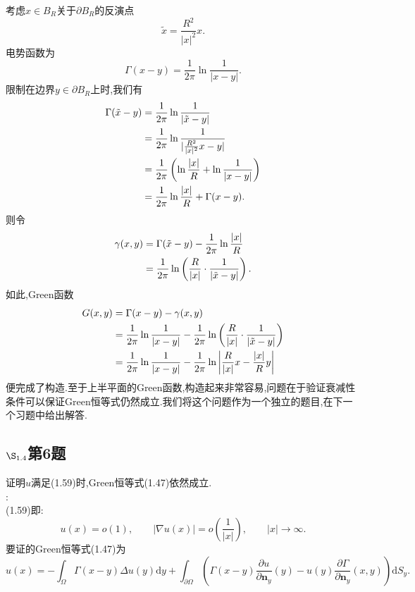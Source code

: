 \documentclass[12pt, a4paper]{ctexbook}
\newcommand{\dy}{\text{d}y}
\newcommand{\dS}{\text{d}S}
\begin{document}
    考虑$x\in B_R$关于$\partial B_R$的反演点$$\tilde{x}=\frac{R^2 }{|x|^2}x.$$
    电势函数为$$
    \Gamma (x-y)=\frac{1}{2\pi}    \ln\frac{1}{|x-y|}.$$
    限制在边界$y\in \partial B_R$上时,我们有
    \begin{align}
    \Gamma(\tilde{x}-y)&=\frac{1}{2\pi}    \ln\frac{1}{|\tilde{x}-y|} \notag\\
    &=\frac{1}{2\pi} \ln\frac{1}{|\frac{R^2 }{|x|^2}x-y|} \notag \\
    &=\frac{1}{2\pi} \left( \ln\frac{|x|}{R}+\ln \frac{1}{|x-y|} \right) \notag \\
    &=\frac{1}{2\pi} \ln\frac{|x|}{R}+ \Gamma (x-y) \notag .
    \end{align}
    则令
    \begin{align}
    \gamma(x,y) &= \Gamma(\tilde{x}-y)-\frac{1}{2\pi} \ln\frac{|x|}{R} \notag\\
    &= \frac{1}{2\pi} \ln\left( \frac{R}{|x|} \cdot\frac{1}{|\tilde{x}-y|} \right)\notag.
    \end{align}
    如此,Green函数
    \begin{align}
    G(x,y)&=\Gamma(x-y) -\gamma(x,y)\notag\\
    &=\frac{1}{2\pi} \ln\frac{1}{|x-y|}-\frac{1}{2\pi} \ln\left( \frac{R}{|x|} \cdot\frac{1}{|\tilde{x}-y|}\right) \notag\\
    &= \frac{1}{2\pi} \ln\frac{1}{|x-y|}- \frac{1}{2\pi} \ln \left| \frac{R}{|x|}x-\frac{|x|}{R}y\right| \notag
    \end{align}
    便完成了构造.至于上半平面的Green函数,构造起来非常容易,问题在于验证衰减性条件可以保证Green恒等式仍然成立.我们将这个问题作为一个独立的题目,在下一个习题中给出解答.
    
    \subsection{$\S_{1.4}$第6题}
    \kaishu{}证明$u$满足(1.59)时,Green恒等式(1.47)依然成立.\\
    
    \songti{}:\\
    
    (1.59)即:$$
    u(x)=o(1),\qquad |\nabla u(x)|=o\left( \frac{1}{|x|} \right), \qquad |x| \to \infty. $$
    要证的Green恒等式(1.47)为$$
    u(x)= -\int_{\Omega} \Gamma(x-y) \Delta u(y) \dy + \int_{\partial \Omega} \left(\Gamma(x-y) \frac{\partial u}{\partial \bm{n}_y}(y) -u(y)\frac{\partial \Gamma}{\partial \bm{n}_y}(x,y)   \right) \dS_y. $$
    
\end{document}
